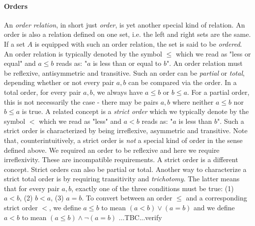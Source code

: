 


\paragraph{Orders} \label{Par:Orders} An \emph{order relation}, in short just \emph{order}, is yet another special kind of relation. An order is also a relation defined on one set, i.e. the left and right sets are the same. If a set $A$ is equipped with such an order relation, the set is said to be \emph{ordered}. An order relation is typically denoted by the symbol $\leq$ which we read as "less or equal" and $a \leq b$ reads as: "$a$ is less than or equal to $b$". An order relation must be reflexive, antisymmetric and transitive. Such an order can be \emph{partial} or \emph{total}, depending whether or not every pair $a,b$ can be compared via the order. In a total order, for every pair $a,b$, we always have $a \leq b$ or $b \leq a$. For a partial order, this is not necessarily the case - there may be pairs $a,b$ where neither $a \leq b$ nor $b \leq a$ is true. A related concept is a \emph{strict order} which we typically denote by the symbol $<$ which we read as "less" and $a < b$ reads as: "$a$ is less than $b$". Such a strict order is characterized by being irreflexive, asymmetric and transitive. Note that, counterintuitively, a strict order is \emph{not} a special kind of order in the sense defined above. We required an order to be reflexive and here we require irreflexivity. These are incompatible requirements. A strict order is a different concept. Strict orders can also be partial or total. Another way to characterize a strict total order is by requiring transitivity and \emph{trichotomy}. The latter means that for every pair $a,b$, exactly one of the three conditions must be true: (1) $a < b$, (2) $b < a$, (3) $a = b$. To convert between an order $\leq$ and a corresponding strict order $<$, we define $a \leq b$ to mean $(a < b) \vee (a = b)$ and we define $a < b$ to mean $(a \leq b) \wedge \neg (a = b)$
 ...TBC...verify

